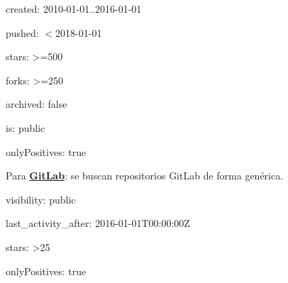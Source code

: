 \begin{compactitem}
\begin{compactitem}
        \begin{compactitem}
            \item created: 2010-01-01..2016-01-01
            \item pushed: $<$2018-01-01
            \item stars: \textgreater=500
            \item forks: \textgreater=250
            \item archived: false
            \item is: public
            \item onlyPositives: true
        \end{compactitem}
    \end{compactitem}
    \item Para \textbf{\underline{GitLab}}: se buscan repositorios GitLab de forma genérica.
    \begin{compactitem}
        \item visibility: public
        \item last\_activity\_after: 2016-01-01T00:00:00Z
        \item stars: \textgreater25
        \item onlyPositives: true
    \end{compactitem}
\end{compactitem}

